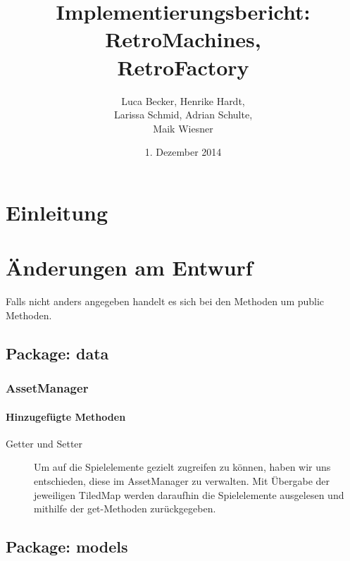 \documentclass[parskip=full]{scrreprt}
\begin{document}
\title{Implementierungsbericht: RetroMachines, \\ RetroFactory}
\author{Luca Becker, Henrike Hardt,\\Larissa Schmid, Adrian Schulte,\\Maik Wiesner}
\date{1. Dezember 2014}
\maketitle
\thispagestyle{empty}

\clearpage

\thispagestyle{empty}
\tableofcontents
\thispagestyle{empty}

\clearpage
\setcounter{page}{1}

\chapter{Einleitung}

\chapter{Änderungen am Entwurf}

Falls nicht anders angegeben handelt es sich bei den Methoden um public Methoden.

\section{Package: data}

\subsection{AssetManager}

\subsubsection{Hinzugefügte Methoden}
\begin{description}
	\item[Getter und Setter] Um auf die Spielelemente gezielt zugreifen zu können, haben wir uns entschieden, diese im AssetManager zu verwalten. Mit Übergabe der jeweiligen TiledMap werden daraufhin die Spielelemente ausgelesen und mithilfe der get-Methoden zurückgegeben.
\end{description}

\section{Package: models}
\end{document}
